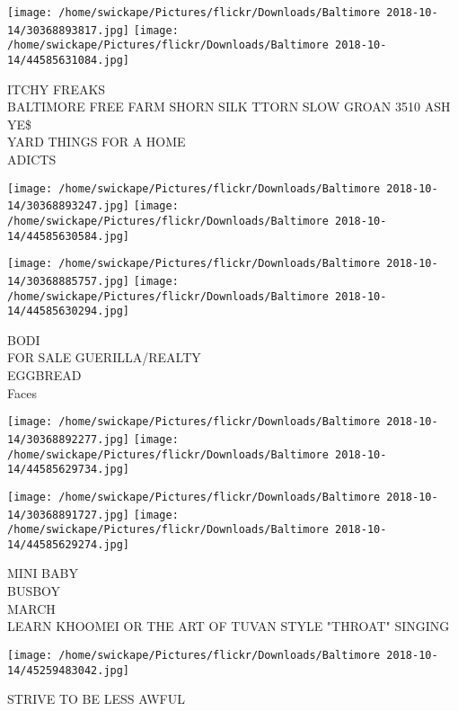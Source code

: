 \documentclass[10pt,letterpaper]{article}
\begin{document}
\texttt{[image: /home/swickape/Pictures/flickr/Downloads/Baltimore 2018-10-14/30368893817.jpg]}
\texttt{[image: /home/swickape/Pictures/flickr/Downloads/Baltimore 2018-10-14/44585631084.jpg]}

ITCHY FREAKS\\
BALTIMORE FREE FARM SHORN SILK TTORN SLOW GROAN 3510 ASH YE\$\\
YARD THINGS FOR A HOME\\
ADICTS\\
\pagebreak

\texttt{[image: /home/swickape/Pictures/flickr/Downloads/Baltimore 2018-10-14/30368893247.jpg]}
\texttt{[image: /home/swickape/Pictures/flickr/Downloads/Baltimore 2018-10-14/44585630584.jpg]}

\texttt{[image: /home/swickape/Pictures/flickr/Downloads/Baltimore 2018-10-14/30368885757.jpg]}
\texttt{[image: /home/swickape/Pictures/flickr/Downloads/Baltimore 2018-10-14/44585630294.jpg]}

BODI\\
FOR SALE GUERILLA/REALTY\\
EGGBREAD\\
Faces\\
\pagebreak

\texttt{[image: /home/swickape/Pictures/flickr/Downloads/Baltimore 2018-10-14/30368892277.jpg]}
\texttt{[image: /home/swickape/Pictures/flickr/Downloads/Baltimore 2018-10-14/44585629734.jpg]}

\texttt{[image: /home/swickape/Pictures/flickr/Downloads/Baltimore 2018-10-14/30368891727.jpg]}
\texttt{[image: /home/swickape/Pictures/flickr/Downloads/Baltimore 2018-10-14/44585629274.jpg]}

MINI BABY\\
BUSBOY\\
MARCH\\
LEARN KHOOMEI OR THE ART OF TUVAN STYLE "THROAT" SINGING\\
\pagebreak

\texttt{[image: /home/swickape/Pictures/flickr/Downloads/Baltimore 2018-10-14/45259483042.jpg]}

STRIVE TO BE LESS AWFUL\\
\pagebreak
\end{document}
